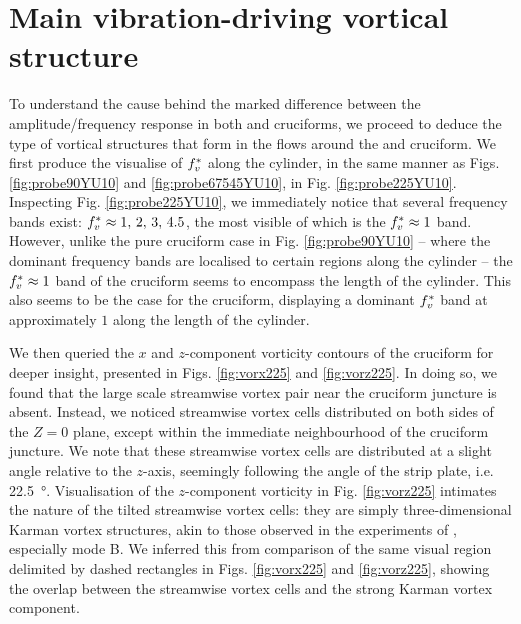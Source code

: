 \documentclass[oneside]{utmthesis}
\begin{document}
\section{Main vibration-driving vortical structure}\label{sec:kvivRegimeVortStruct}
To understand the cause behind the marked difference between the amplitude/frequency response in both \angfo{} and \angth{} cruciforms, we proceed to deduce the type of vortical structures that form in the flows around the \angtw{} and \angon{} cruciform. We first produce the visualise of $f^{*}_{v}$ along the cylinder, in the same manner as Figs. \ref{fig:probe90YU10} and \ref{fig:probe67545YU10}, in Fig. \ref{fig:probe225YU10}. Inspecting Fig. \ref{fig:probe225YU10}, we immediately notice that several frequency bands exist: $f^{*}_{v} \approx 1,\, 2,\, 3,\, 4.5$, the most visible of which is the $f^{*}_{v} \approx 1$ band. However, unlike the pure cruciform case in Fig. \ref{fig:probe90YU10} -- where the dominant frequency bands are localised to certain regions along the cylinder -- the $f^{*}_{v} \approx 1$ band of the \angtw{} cruciform seems to encompass the length of the cylinder. This also seems to be the case for the \angon{} cruciform, displaying a dominant $f^{*}_{v}$ band at approximately $1$ along the length of the cylinder.

We then queried the $x$ and $z$-component vorticity contours of the \angtw{} cruciform for deeper insight, presented in Figs. \ref{fig:vorx225} and \ref{fig:vorz225}. In doing so, we found that the large scale streamwise vortex pair near the cruciform juncture is absent. Instead, we noticed streamwise vortex cells distributed on both sides of the $Z = 0$ plane, except within the immediate neighbourhood of the cruciform juncture. We note that these streamwise vortex cells are distributed at a slight angle relative to the $z$-axis, seemingly following the angle of the strip plate, i.e. \SI{22.5}{\degree}. Visualisation of the $z$-component vorticity in Fig. \ref{fig:vorz225} intimates the nature of the tilted streamwise vortex cells: they are simply three-dimensional Karman vortex structures, akin to those observed in the experiments of \citet{Williamson1996a}, especially mode B. We inferred this from comparison of the same visual region delimited by dashed rectangles in Figs. \ref{fig:vorx225} and \ref{fig:vorz225}, showing the overlap between the streamwise vortex cells and the strong Karman vortex component.
\end{document}
